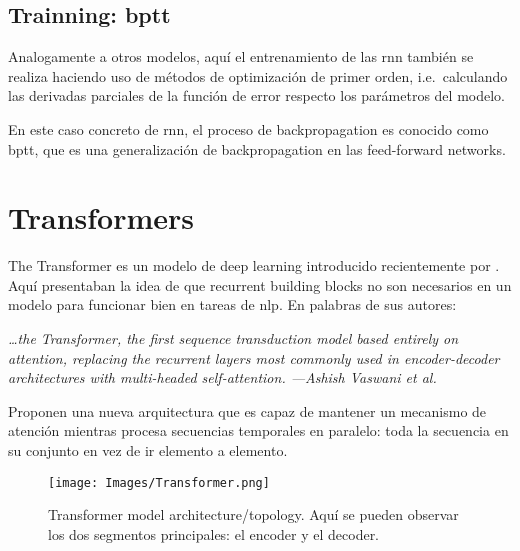 \subsection{Trainning: \acl*{bptt}}

Analogamente a otros modelos, aquí el entrenamiento de las \gls{rnn} también se
realiza haciendo uso de métodos de optimización de primer orden, i.e.\
calculando las derivadas parciales de la función de error respecto los
parámetros del modelo.

En este caso concreto de \gls{rnn}, el proceso de backpropagation es conocido
como \gls{bptt}, que es una generalización de backpropagation en las
feed-forward networks.


\section{Transformers} \label{sec:transformers}

The Transformer es un modelo de deep learning introducido recientemente por
\myCite{vaswani17:atten_all_you_need}. Aquí presentaban la idea de que
recurrent building blocks no son necesarios en un modelo para funcionar bien en
tareas de \gls{nlp}. En palabras de sus autores:

\begin{quoteBox}
  \itshape
  \ldots the Transformer, the first sequence transduction model based entirely
  on attention, replacing the recurrent layers most commonly used in
  encoder-decoder architectures with multi-headed self-attention.
  \tcblower
  \hfill \upshape
  ---Ashish Vaswani et al.
\end{quoteBox}

Proponen una nueva arquitectura que es capaz de mantener un mecanismo de
atención mientras procesa secuencias temporales en paralelo: toda la secuencia
en su conjunto en vez de ir elemento a elemento.

\begin{figure}[p]
  \centering
  \texttt{[image: Images/Transformer.png]}
  \caption[Transformer model architecture]{Transformer model
    architecture/topology. Aquí se pueden observar los dos segmentos
    principales: el encoder y el decoder.}
  \label{fig:transformer}
\end{figure}

